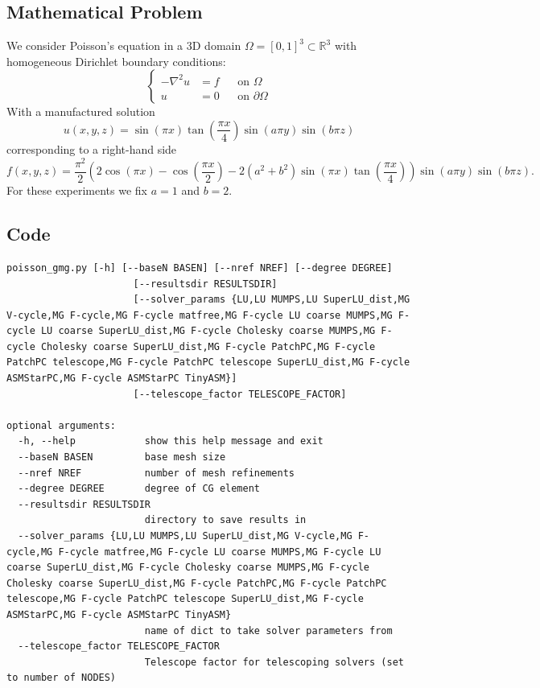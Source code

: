 \documentclass[a4paper,11pt]{article}
\newcommand{\RR}{\mathbb{R}}
\begin{document}
\subsection{Mathematical Problem}
\label{ssec:maths}
We consider Poisson's equation in a 3D domain $\Omega=[0,1]^3\subset\RR^3$ with homogeneous Dirichlet boundary conditions:
\begin{equation}
\left\{
\begin{aligned}
	-\nabla^2 u &= f && \text{on } \Omega\\
	u &= 0 && \text{on } \partial\Omega
\end{aligned}
\right.
\end{equation}
With a manufactured solution
\begin{equation}
	u(x, y, z) = \sin(\pi x)\tan\left(\frac{\pi x}{4}\right)\sin(a\pi y)\sin(b\pi z)
\end{equation}
corresponding to a right-hand side
\begin{equation}
	f(x, y, z) = \frac{\pi^2}{2}
	\left( 2\cos(\pi x) - \cos\left( \frac{\pi x}{2} \right) - 2(a^2 + b^2)\sin(\pi x)\tan \left( \frac{\pi x}{4} \right)  \right) 
	\sin(a\pi y) \sin(b\pi z).
\end{equation}
For these experiments we fix $a=1$ and $b=2$.

\subsection{Code}
\label{ssec:code}
\begin{lstlisting}
poisson_gmg.py [-h] [--baseN BASEN] [--nref NREF] [--degree DEGREE]
                      [--resultsdir RESULTSDIR]
                      [--solver_params {LU,LU MUMPS,LU SuperLU_dist,MG V-cycle,MG F-cycle,MG F-cycle matfree,MG F-cycle LU coarse MUMPS,MG F-cycle LU coarse SuperLU_dist,MG F-cycle Cholesky coarse MUMPS,MG F-cycle Cholesky coarse SuperLU_dist,MG F-cycle PatchPC,MG F-cycle PatchPC telescope,MG F-cycle PatchPC telescope SuperLU_dist,MG F-cycle ASMStarPC,MG F-cycle ASMStarPC TinyASM}]
                      [--telescope_factor TELESCOPE_FACTOR]

optional arguments:
  -h, --help            show this help message and exit
  --baseN BASEN         base mesh size
  --nref NREF           number of mesh refinements
  --degree DEGREE       degree of CG element
  --resultsdir RESULTSDIR
                        directory to save results in
  --solver_params {LU,LU MUMPS,LU SuperLU_dist,MG V-cycle,MG F-cycle,MG F-cycle matfree,MG F-cycle LU coarse MUMPS,MG F-cycle LU coarse SuperLU_dist,MG F-cycle Cholesky coarse MUMPS,MG F-cycle Cholesky coarse SuperLU_dist,MG F-cycle PatchPC,MG F-cycle PatchPC telescope,MG F-cycle PatchPC telescope SuperLU_dist,MG F-cycle ASMStarPC,MG F-cycle ASMStarPC TinyASM}
                        name of dict to take solver parameters from
  --telescope_factor TELESCOPE_FACTOR
                        Telescope factor for telescoping solvers (set to number of NODES)

\end{lstlisting}
\end{document}
